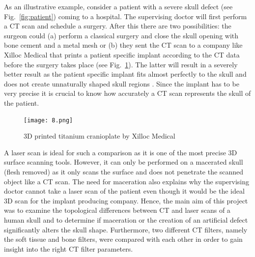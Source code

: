 \documentclass[a4paper]{article}
\begin{document}
As an illustrative example, consider a patient with a severe skull defect (see Fig.~\ref{fig:patient}) coming to a hospital. The supervising doctor will first perform a CT scan and schedule a surgery. After this there are two possibilities: the surgeon could (a) perform a classical surgery and close the skull opening with bone cement and a metal mesh or (b) they sent the CT scan to a company like Xilloc Medical that prints a patient specific implant according to the CT data before the surgery takes place (see Fig.~\ref{fig:xilloc_cranioplate}). The latter will result in a severely better result as the patient specific implant fits almost perfectly to the skull and does not create unnaturally shaped skull regions \citep{maikelbeerens}. Since the implant has to be very precise it is crucial to know how accurately a CT scan represents the skull of the patient.

\begin{figure}[!ht]
\centering
\texttt{[image: 8.png]}
\caption{\label{fig:xilloc_cranioplate}3D printed titanium cranioplate by Xilloc Medical \citep*{lethaus2011treatment}}
\end{figure}
\newpage
A laser scan is ideal for such a comparison as it is one of the most precise 3D surface scanning tools. However, it can only be performed on a macerated skull (flesh removed) as it only scans the surface and does not penetrate the scanned object like a CT scan. The need for maceration also explains why the supervising doctor cannot take a laser scan of the patient even though it would be the ideal 3D scan for the implant producing company. Hence, the main aim of this project was to examine the topological differences between CT and laser scans of a human skull and to determine if maceration or the creation of an artificial defect significantly alters the skull shape. Furthermore, two different CT filters, namely the soft tissue and bone filters, were compared with each other in order to gain insight into the right CT filter parameters.
\end{document}
